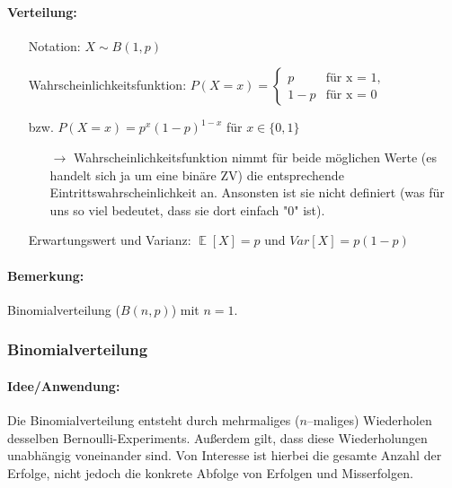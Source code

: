 \documentclass[a4paper]{article}
\DeclareMathOperator*{\E}{\mathbb{E}}
\begin{document}
\paragraph{Verteilung:}
\begin{itemize}
\item[] Notation: $X\sim B(1,p)$
\item[] Wahrscheinlichkeitsfunktion: $P(X=x) = \begin{cases}
			p & \text{für x = 1,}\\
            1-p & \text{für x = 0}
		 \end{cases}$ 
\item[] \hspace{4.5cm} bzw. $P(X=x)=p^x(1-p)^{1-x}$ für $x \in \{0,1\}$
	\begin{itemize}
	\item[$\rightarrow$] Wahrscheinlichkeitsfunktion nimmt für beide möglichen Werte (es handelt sich ja um eine binäre ZV) die entsprechende Eintrittswahrscheinlichkeit an. Ansonsten ist sie nicht definiert (was für uns so viel bedeutet, dass sie dort einfach "0" ist).
	\end{itemize}
\item[] Erwartungswert und Varianz: $\E[X]=p$ und $Var[X]=p(1-p)$
\end{itemize}

\paragraph{Bemerkung:} Binomialverteilung ($B(n,p)$) mit $n=1$.\\

\noindent {}

\subsubsection{Binomialverteilung} \label{sec:Bin}

\paragraph{Idee/Anwendung:} Die Binomialverteilung entsteht durch mehrmaliges ($n$--maliges) Wiederholen desselben Bernoulli-Experiments. Außerdem gilt, dass diese Wiederholungen unabhängig voneinander sind. Von Interesse ist hierbei die gesamte Anzahl der Erfolge, nicht jedoch die konkrete Abfolge von Erfolgen und Misserfolgen.
\end{document}
